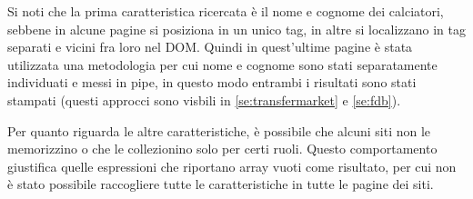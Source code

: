 Si noti che la prima caratteristica ricercata è il nome e cognome dei calciatori, sebbene in alcune pagine si posiziona in un unico tag, in altre si localizzano in tag separati e vicini fra loro nel DOM. Quindi in quest'ultime pagine è stata utilizzata una metodologia per cui nome e cognome sono stati separatamente individuati e messi in pipe, in questo modo entrambi i risultati sono stati stampati (questi approcci sono visbili in \ref{se:transfermarket} e \ref{se:fdb}). 

Per quanto riguarda le altre caratteristiche, è possibile che alcuni siti non le memorizzino o che le collezionino solo per certi ruoli. Questo comportamento giustifica quelle espressioni che riportano array vuoti come risultato, per cui non è stato possibile raccogliere tutte le caratteristiche in tutte le pagine dei siti.

\newpage
